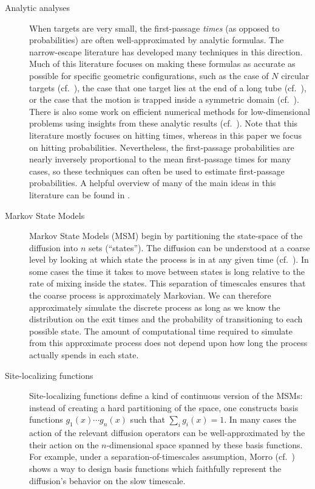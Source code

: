 \documentclass[12pt, nofootinbib,english, amsmath, amssymb, aps, priprint, graphicx,floatfix]{revtex4-1}
\theoremstyle{plain}
\theoremstyle{definition}
\theoremstyle{plain}
\begin{document}
\begin{description}
    \item[Analytic analyses] When targets are very small, the first-passage {\em times} (as opposed to probabilities) are often well-approximated by analytic formulas.  The narrow-escape literature has developed many techniques in this direction.  Much of this literature focuses on making these formulas as accurate as possible for specific geometric configurations, such as the case of $N$ circular targets (cf.\ \cite{cheviakov2010asymptotic}), the case that one target lies at the end of a long tube (cf.\ \cite{li2014matched}), or the case that the motion is trapped inside a symmetric domain (cf.\ \cite{Chevalier2010-bq,Condamin2006-vi,Coombs2009-pe,Lindsay2017-ds}).  There is also some work on efficient numerical methods for low-dimensional problems using insights from these analytic results (cf.\ \cite{kaye2019fast}).  Note that this literature mostly focuses on hitting times, whereas in this paper we focus on hitting probabilities.  
Nevertheless, the first-passage probabilities are nearly inversely proportional to the mean first-passage times for many cases, so these techniques can often be used to estimate first-passage probabilities.  A helpful overview of many of the main ideas in this literature can be found in \cite{Benichou2014-jb}.

    \item[Markov State Models] Markov State Models (MSM) begin by partitioning the state-space of the diffusion into $n$ sets (``states'').  The diffusion can be understood at a coarse level by looking at which state the process is in at any given time (cf.\ \cite{Pande2010-yi, Chodera2014-bh, Husic2018-xp}).   In some cases the time it takes to move between states is long relative to the rate of mixing inside the states.  This separation of timescales ensures that the coarse process is approximately Markovian.  We can therefore approximately simulate the discrete process as long as we know the distribution on the exit times and the probability of transitioning to each possible state.  The amount of computational time required to simulate from this approximate process does not depend upon how long the process actually spends in each state.

    \item[Site-localizing functions] Site-localizing functions define a kind of continuous version of the MSMs: instead of creating a hard partitioning of the space, one constructs basis functions $g_1(x)\cdots g_n(x)$ such that $\sum_i g_i(x)=1$.  In many cases the action of the relevant diffusion operators can be well-approximated by the their action on the $n$-dimensional space spanned by these basis functions.   For example, under a separation-of-timescales assumption, Morro (cf.\ \cite{moro1995kinetic}) shows a way to design basis functions which faithfully represent the diffusion's behavior on the slow timescale.


\end{description}
\end{document}
